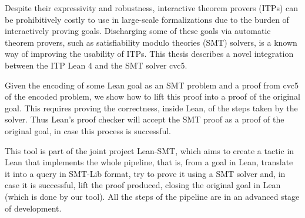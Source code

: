 Despite their expressivity and robustness, interactive theorem provers (ITPs)
can be prohibitively costly to use in large-scale formalizations due to the burden of
interactively proving goals.
%
Discharging some of these goals via automatic theorem provers, such as
satisfiability modulo theories (SMT) solvers, is a known way of improving the
usability of ITPs.
%
This thesis describes a novel integration between the ITP
Lean 4 and the SMT solver cvc5.

Given the encoding of some Lean goal as an SMT problem and a proof from
cvc5 of the encoded problem, we show how to lift this proof into a proof
of the original goal.
%
This requires proving the correctness, inside Lean, of the steps taken by the
solver. Thus Lean's proof checker will accept the SMT proof as a proof of the original goal, in case this process is successful.

This tool is part of the joint project Lean-SMT, which aims to create a
tactic in Lean that implements the whole pipeline, that is, from a goal in
Lean, translate it into a query in SMT-Lib format, try to prove it using
a SMT solver and, in case it is successful, lift the proof produced,
closing the original goal in Lean (which is done by our tool).
%
All the steps of the pipeline are in an advanced stage of development.
